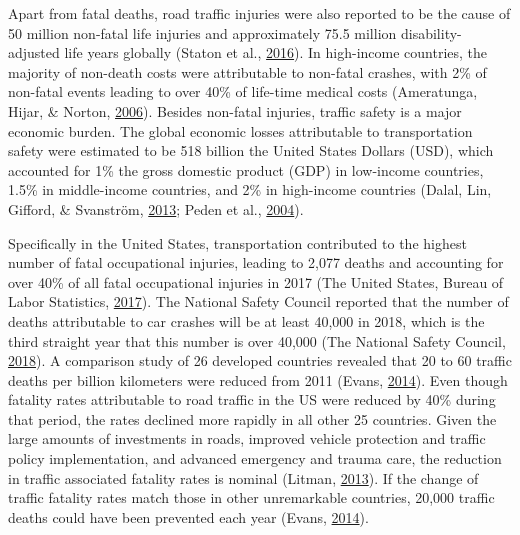 \documentclass[12pt]{book}
\numberwithin{equation}{chapter}
\begin{document}
Apart from fatal deaths, road traffic injuries were also reported to be the cause of 50 million non-fatal life injuries and approximately 75.5 million disability-adjusted life years globally (Staton et al., \protect\hyperlink{ref-staton2016road}{2016}).
In high-income countries, the majority of non-death costs were attributable to non-fatal crashes, with 2\% of non-fatal events leading to over 40\% of life-time medical costs (Ameratunga, Hijar, \& Norton, \protect\hyperlink{ref-ameratunga2006road}{2006}).
Besides non-fatal injuries, traffic safety is a major economic burden.
The global economic losses attributable to transportation safety were estimated to be 518 billion the United States Dollars (USD), which accounted for 1\% the gross domestic product (GDP) in low-income countries, 1.5\% in middle-income countries, and 2\% in high-income countries (Dalal, Lin, Gifford, \& Svanström, \protect\hyperlink{ref-dalal2013economics}{2013}; Peden et al., \protect\hyperlink{ref-peden2004world}{2004}).

Specifically in the United States, transportation contributed to the highest number of fatal occupational injuries, leading to 2,077 deaths and accounting for over 40\% of all fatal occupational injuries in 2017 (The United States, Bureau of Labor Statistics, \protect\hyperlink{ref-bols}{2017}).
The National Safety Council reported that the number of deaths attributable to car crashes will be at least 40,000 in 2018, which is the third straight year that this number is over 40,000 (The National Safety Council, \protect\hyperlink{ref-nsc2018}{2018}).
A comparison study of 26 developed countries revealed that 20 to 60 traffic deaths per billion kilometers were reduced from 2011 (Evans, \protect\hyperlink{ref-evans2014traffic}{2014}).
Even though fatality rates attributable to road traffic in the US were reduced by 40\% during that period, the rates declined more rapidly in all other 25 countries.
Given the large amounts of investments in roads, improved vehicle protection and traffic policy implementation, and advanced emergency and trauma care, the reduction in traffic associated fatality rates is nominal (Litman, \protect\hyperlink{ref-litman2013transportation}{2013}).
If the change of traffic fatality rates match those in other unremarkable countries, 20,000 traffic deaths could have been prevented each year (Evans, \protect\hyperlink{ref-evans2014traffic}{2014}).
\end{document}
